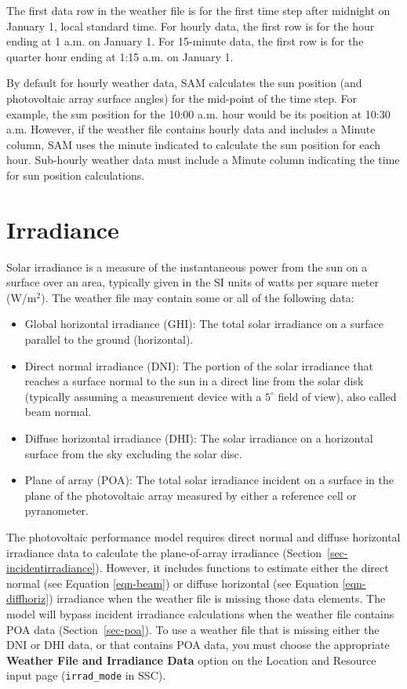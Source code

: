\documentclass[12pt,letterpaper]{article}
\begin{document}
The first data row in the weather file is for the first time step after midnight on January 1, local standard time. For hourly data, the first row is for the hour ending at 1 a.m. on January 1. For 15-minute data, the first row is for the quarter hour ending at 1:15 a.m. on January 1.

By default for hourly weather data, SAM calculates the sun position (and photovoltaic array surface angles) for the mid-point of the time step. For example, the sun position for the 10:00 a.m. hour would be its position at 10:30 a.m. However, if the weather file contains hourly data and includes a Minute column, SAM uses the minute indicated to calculate the sun position for each hour. Sub-hourly weather data must include a Minute column indicating the time for sun position calculations.

\section{Irradiance}


Solar irradiance is a measure of the instantaneous power from the sun on a surface over an area, typically given in the SI units of watts per square meter (W/m$^2$). The weather file may contain some or all of the following data:

\begin{itemize}
\item Global horizontal irradiance (GHI): The total solar irradiance on a surface parallel to the ground (horizontal).
\item Direct normal irradiance (DNI): The portion of the solar irradiance that reaches a surface normal to the sun in a direct line from the solar disk (typically assuming a measurement device with a $5^{\circ}$ field of view), also called beam normal.
\item Diffuse horizontal irradiance (DHI): The solar irradiance on a horizontal surface from the sky excluding the solar disc.
\item Plane of array (POA): The total solar irradiance incident on a surface in the plane of the photovoltaic array measured by either a reference cell or pyranometer.
\end{itemize}

The photovoltaic performance model requires direct normal and diffuse horizontal irradiance data to calculate the plane-of-array irradiance (Section~\ref{sec-incidentirradiance}). However, it includes functions to estimate either the direct normal (see Equation \ref{eqn-beam}) or diffuse horizontal (see Equation \ref{eqn-diffhoriz}) irradiance when the weather file is missing those data elements. The model will bypass incident irradiance calculations when the weather file contains POA data (Section~\ref{sec-poa}). To use a weather file that is missing either the DNI or DHI data, or that contains POA data, you must choose the appropriate \textbf{Weather File and Irradiance Data} option on the Location and Resource input page (\texttt{irrad\_mode} in SSC).
\end{document}
